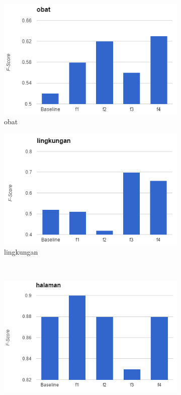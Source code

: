 \begin{figure}[H]
	\begin{subfigure}{.5\textwidth}
		\centering
		\includegraphics[width=1\linewidth]{adit_pics/obat.png}
		\caption{obat}
	\end{subfigure}%
	\begin{subfigure}{.5\textwidth}
		\centering
		\includegraphics[width=1\linewidth]{adit_pics/lingkungan.png}
		\caption{lingkungan}
	\end{subfigure}%
	\\
	\begin{subfigure}{.5\textwidth}
		\centering
		\includegraphics[width=1\linewidth]{adit_pics/halaman.png}

\end{subfigure}
\end{figure}
